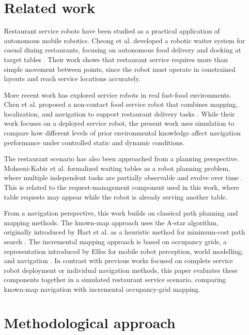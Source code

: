 \documentclass[conference]{IEEEtran}
\begin{document}
\section{Related work}

Restaurant service robots have been studied as a practical application of autonomous mobile robotics. Cheong et al. developed a robotic waiter system for casual dining restaurants, focusing on autonomous food delivery and docking at target tables \cite{cheong2016roboticwaiter}. Their work shows that restaurant service requires more than simple movement between points, since the robot must operate in constrained layouts and reach service locations accurately.

More recent work has explored service robots in real fast-food environments. Chen et al. proposed a non-contact food service robot that combines mapping, localization, and navigation to support restaurant delivery tasks \cite{chen2022noncontact}. While their work focuses on a deployed service robot, the present work uses simulation to compare how different levels of prior environmental knowledge affect navigation performance under controlled static and dynamic conditions.

The restaurant scenario has also been approached from a planning perspective. Mohseni-Kabir et al. formalized waiting tables as a robot planning problem, where multiple independent tasks are partially observable and evolve over time \cite{mohseni2021waiting}. This is related to the request-management component used in this work, where table requests may appear while the robot is already serving another table.

From a navigation perspective, this work builds on classical path planning and mapping methods. The known-map approach uses the A-star algorithm, originally introduced by Hart et al. as a heuristic method for minimum-cost path search \cite{hart1968astar}. The incremental mapping approach is based on occupancy grids, a representation introduced by Elfes for mobile robot perception, world modelling, and navigation \cite{elfes1989occupancy}. In contrast with previous works focused on complete service robot deployment or individual navigation methods, this paper evaluates these components together in a simulated restaurant service scenario, comparing known-map navigation with incremental occupancy-grid mapping.



\section{Methodological approach}
\end{document}
